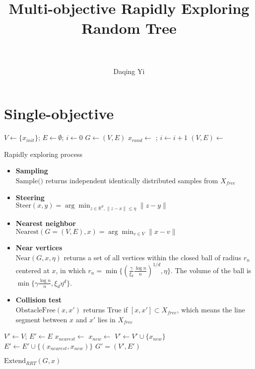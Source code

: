 \documentclass[paper=a4, fontsize=11pt]{scrartcl}
\title{
		\normalfont
		\horrule{0.5pt} \\[0.4cm]
		\huge Multi-objective Rapidly Exploring Random Tree \\
		\horrule{2pt} \\[0.5cm]
}
\author{
		\normalfont %
        Daqing Yi \\
}
\begin{document}
\maketitle

\section{Single-objective}

\begin{algorithm}
\begin{algorithmic}[1]
\State $ V \leftarrow \{ x_{init} \} $; $ E \leftarrow \emptyset $; $ i \leftarrow 0 $
\State $ G \leftarrow (V, E) $
\State $ x_{rand} \leftarrow $  ; $ i \leftarrow i + 1 $
\State $ (V, E) \leftarrow $ 
\EndWhile
\end{algorithmic}
\label{alg:rapidly_exploring_process}
\caption{Rapidly exploring process}
\end{algorithm}

\begin{itemize}
\item \textbf{Sampling} \\
$ \mbox{Sample(}) $ returns independent identically distributed samples from $ X_{free} $
\item \textbf{Steering} \\
$ \mbox{Steer}(x,y) = \arg \min_{ z \in \mathbb{R}^{d}, \lVert z -x \rVert \leq \eta } \lVert z - y \rVert $
\item \textbf{Nearest neighbor} \\
$ \mbox{Nearest}(G = (V,E), x) = \arg \min_{v \in V} \lVert x - v \rVert $ 
\item \textbf{Near vertices} \\
$ \mbox{Near}(G, x, \eta) $ returns a set of all vertices within the closed ball of radius $ r_{n} $ centered at $ x $, in which $ r_{n} = \min \{ ( \frac{\gamma}{\xi_{d}} \frac{\log n}{n} )^{1/d}  , \eta \} $.
The volume of the ball is $ \min \{ \gamma \frac{\log n}{n} , \xi_{d} \eta^{d} \} $.
\item \textbf{Collision test} \\
$ \mbox{ObstacleFree}(x, x') $ returns True if $ [ x, x' ] \subset X_{free} $, which means the line segment between $ x $ and $ x' $ lies in $ X _{free} $
\end{itemize}

\begin{algorithm}
\begin{algorithmic}[1]
\State $ V' \leftarrow V $; $ E' \leftarrow E $
\State $ x_{nearest} \leftarrow $ 
\State $ x_{new} \leftarrow $ 
\State $ V' \leftarrow V' \cup \{ x_{new} \} $
\State $ E' \leftarrow E' \cup \{ ( x_{nearest} , x_{new} ) \} $
\EndIf
\Return $ G' = (V', E') $ 
\end{algorithmic}
\label{alg:rrt_extend}
\caption{ $ \mbox{Extend}_{RRT} (G, x) $}
\end{algorithm}
\end{document}

